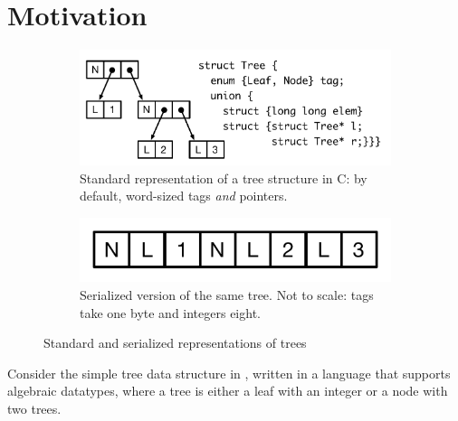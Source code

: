 
\section{Motivation}\label{sec:intro-motivation}

\begin{figure}
  \begin{subfigure}[t]{\linewidth}
    \centering
    \includegraphics[scale=0.5]{intro-tree-unpacked}
    \caption{Standard representation of a tree structure in C: by default,
      word-sized tags {\em and} pointers.}
    \label{fig:intro-tree-unpacked}
  \end{subfigure}
  \begin{subfigure}[t]{\linewidth}
    \centering
    \includegraphics[scale=0.5]{intro-tree-packed}
    \caption{Serialized version of the same tree.  Not to scale: tags take one
      byte and integers eight.}
    \label{fig:intro-tree-packed}
  \end{subfigure}
  \caption{Standard and serialized representations of trees}
  \label{fig:intro-fig}
\end{figure}

Consider the simple tree data structure in , written in
a language that supports algebraic datatypes, where a tree is either a leaf with
an integer or a node with two trees.

